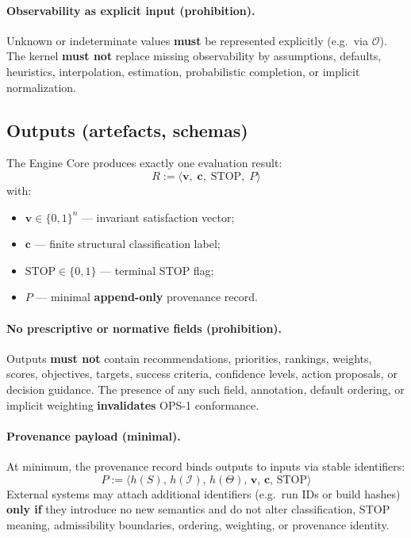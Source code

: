 \paragraph{Observability as explicit input (prohibition).}
Unknown or indeterminate values \textbf{must} be represented explicitly
(e.g.\ via $\mathcal{O}$).
The kernel \textbf{must not} replace missing observability by assumptions,
defaults, heuristics, interpolation, estimation, probabilistic completion,
or implicit normalization.

\subsection{Outputs (artefacts, schemas)}

The Engine Core produces exactly one evaluation result:
\[
R := \langle \mathbf{v},\; \mathbf{c},\; \mathrm{STOP},\; P \rangle
\]
with:
\begin{itemize}
  \item $\mathbf{v}\in\{0,1\}^n$ — invariant satisfaction vector;
  \item $\mathbf{c}$ — finite structural classification label;
  \item $\mathrm{STOP}\in\{0,1\}$ — terminal STOP flag;
  \item $P$ — minimal \textbf{append-only} provenance record.
\end{itemize}

\paragraph{No prescriptive or normative fields (prohibition).}
Outputs \textbf{must not} contain recommendations, priorities, rankings,
weights, scores, objectives, targets, success criteria, confidence levels,
action proposals, or decision guidance.
The presence of any such field, annotation, default ordering, or implicit
weighting \textbf{invalidates} OPS-1 conformance.

\paragraph{Provenance payload (minimal).}
At minimum, the provenance record binds outputs to inputs via stable identifiers:
\[
P := \langle h(S),\, h(\mathcal{I}),\, h(\Theta),\, \mathbf{v},\, \mathbf{c},\, \mathrm{STOP} \rangle
\]
External systems may attach additional identifiers (e.g.\ run IDs or build hashes)
\textbf{only if} they introduce no new semantics and do not alter classification,
STOP meaning, admissibility boundaries, ordering, weighting, or provenance identity.

